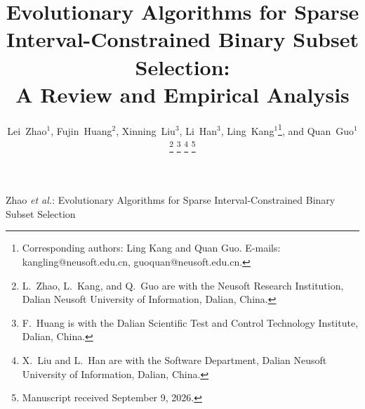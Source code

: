 \documentclass[lettersize,journal]{IEEEtran}
\newcommand{\NutriOptFixDisplays}{%
  \raggedbottom
  \setlength{\abovedisplayskip}{10pt plus 2pt minus 0pt}%
  \setlength{\belowdisplayskip}{14pt plus 2pt minus 0pt}%
  \setlength{\abovedisplayshortskip}{10pt plus 2pt minus 0pt}%
  \setlength{\belowdisplayshortskip}{14pt plus 2pt minus 0pt}%
}
\begin{document}
\NutriOptFixDisplays

\title{Evolutionary Algorithms for Sparse Interval-Constrained Binary Subset Selection:\\
A Review and Empirical Analysis}

\author{Lei~Zhao$^{1}$,
Fujin~Huang$^{2}$,
Xinning~Liu$^{3}$,
Li~Han$^{3}$,
Ling~Kang$^{1}$\thanks{Corresponding authors: Ling Kang and Quan Guo.
E-mails: kangling@neusoft.edu.cn, guoquan@neusoft.edu.cn.},
and Quan~Guo$^{1}$%
\thanks{L.~Zhao, L.~Kang, and Q.~Guo are with the Neusoft Research Institution,
Dalian Neusoft University of Information, Dalian, China.}%
\thanks{F.~Huang is with the Dalian Scientific Test and Control Technology Institute, Dalian, China.}%
\thanks{X.~Liu and L.~Han are with the Software Department,
Dalian Neusoft University of Information, Dalian, China.}%
\thanks{Manuscript received September 9, 2026.}}

%
{Zhao \MakeLowercase{\textit{et al.}}: Evolutionary Algorithms for Sparse Interval-Constrained Binary Subset Selection}

\maketitle
\end{document}
